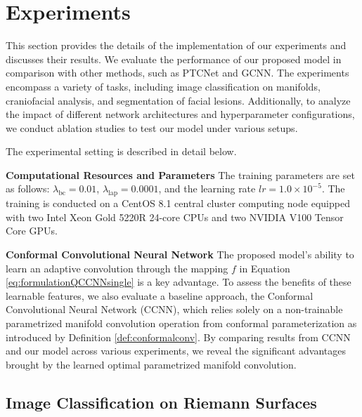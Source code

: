 \section{Experiments}
This section provides the details of the implementation of our experiments and discusses their results. We evaluate the performance of our proposed model in comparison with other methods, such as PTCNet and GCNN. The experiments encompass a variety of tasks, including image classification on manifolds, craniofacial analysis, and segmentation of facial lesions. Additionally, to analyze the impact of different network architectures and hyperparameter configurations, we conduct ablation studies to test our model under various setups.

The experimental setting is described in detail below.

\noindent\textbf{Computational Resources and Parameters}
The training parameters are set as follows: \(\lambda_\text{bc} = 0.01\), \(\lambda_\text{lap} = 0.0001\), and the learning rate \(lr = 1.0 \times 10^{-5}\). The training is conducted on a CentOS 8.1 central cluster computing node equipped with two Intel Xeon Gold 5220R 24-core CPUs and two NVIDIA V100 Tensor Core GPUs.

\noindent\textbf{Conformal Convolutional Neural Network} The proposed model's ability to learn an adaptive convolution through the mapping $f$ in Equation \eqref{eq:formulationQCCNNsingle} is a key advantage. To assess the benefits of these learnable features, we also evaluate a baseline approach, the Conformal Convolutional Neural Network (CCNN), which relies solely on a non-trainable parametrized manifold convolution operation from conformal parameterization as introduced by Definition \ref{def:conformalconv}. By comparing results from CCNN and our model across various experiments, we reveal the significant advantages brought by the learned optimal parametrized manifold convolution.
\subsection{Image Classification on Riemann Surfaces}


